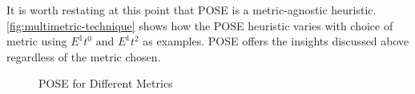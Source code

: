 It is worth restating at this point that POSE is a metric-agnostic heuristic. \autoref{fig:multimetric-technique} shows how the POSE heuristic varies with choice of metric using $E^1t^0$ and $E^1t^2$ as examples. POSE offers the insights discussed above regardless of the metric chosen.

\begin{figure}
\centering

\caption{POSE for Different Metrics}
\label{fig:multimetric-technique}
\end{figure}
